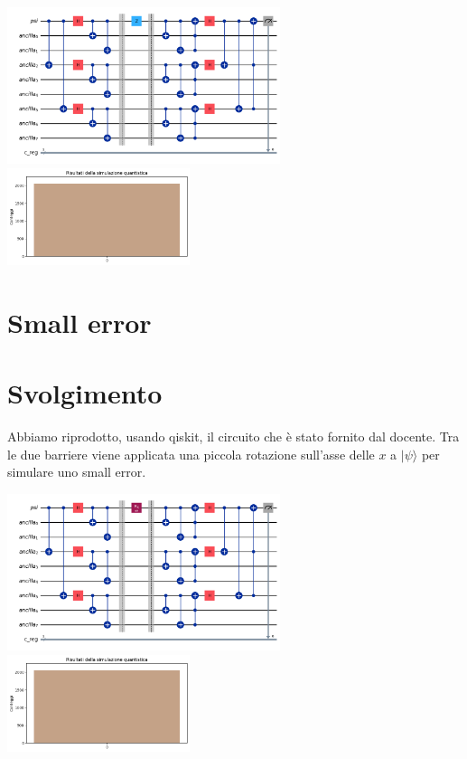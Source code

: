 \documentclass[12pt, a4paper]{article}
\newcommand{\ket}[1]{| #1 \rangle}
\begin{document}
\begin{center} 
        \includegraphics[width=0.6\textwidth]{img/circuitPhaseflip.png} 
        \includegraphics[width=0.4\textwidth]{img/resultsSuccessPhaseflip.png}
\end{center}

\section*{Small error}
\section*{Svolgimento}
Abbiamo riprodotto, usando qiskit, il circuito che è stato fornito dal docente. Tra le due barriere viene applicata una piccola rotazione sull'asse delle $x$ a $\ket{\psi}$ per simulare uno small error.
   
\begin{center} 
        \includegraphics[width=0.6\textwidth]{img/circuitSmallError.png} 
        \includegraphics[width=0.4\textwidth]{img/resultsSuccessSmallError.png}
\end{center}
\end{document}
